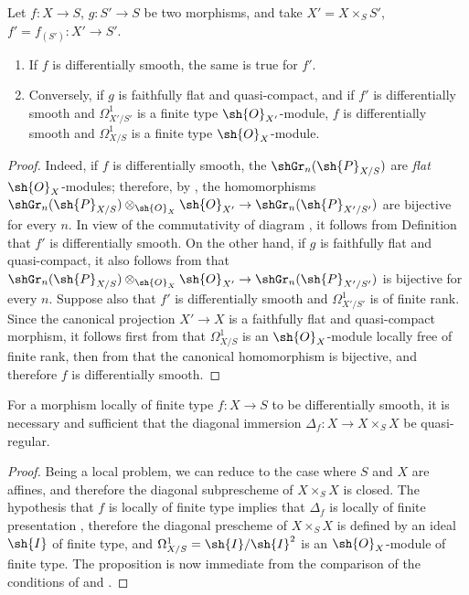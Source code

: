 \begin{proposition}[16.10.4]
\label{IV.16.10.4}
Let $f:X \to S$, $g:S' \to S$ be two morphisms, and take $X' = X \times_S S'$, $f' = f_{(S')}:X' \to S'$.
\begin{enumerate}
  \item[\rm{(i)}] If $f$ is differentially smooth, the same is true for $f'$. 
  \item[\rm{(ii)}] Conversely, if $g$ is faithfully flat and quasi-compact, and if $f'$ is differentially smooth and $\Omega_{X'/S'}^1$ is a finite type $\sh{O}_{X'}$-module, $f$ is differentially smooth and $\Omega_{X/S}^1$ is a finite type $\sh{O}_X$-module.
\end{enumerate}
\end{proposition}

\begin{proof}
Indeed, if $f$ is differentially smooth, the $\shGr_n(\sh{P}_{X/S})$ are \emph{flat} $\sh{O}_X$-modules;
therefore, by , the homomorphisms $\shGr_n(\sh{P}_{X/S}) \otimes_{\sh{O}_X} \sh{O}_{X'} \to \shGr_n(\sh{P}_{X'/S'})$ are bijective for every $n$. In view of the commutativity of diagram , it follows from Definition  that $f'$ is differentially smooth.
On the other hand, if $g$ is faithfully flat and quasi-compact, it also follows from  that $\shGr_n(\sh{P}_{X/S}) \otimes_{\sh{O}_X} \sh{O}_{X'} \to \shGr_n(\sh{P}_{X'/S'})$ is bijective for every $n$.
Suppose also that $f'$ is differentially smooth and $\Omega_{X'/S'}^1$ is of finite rank.
Since the canonical projection $X' \to X$ is a faithfully flat and quasi-compact morphism, it follows first from  that $\Omega_{X/S}^1$ is an $\sh{O}_X$-module locally free of finite rank, then from  that the canonical homomorphism  is bijective, and therefore $f$ is differentially smooth.
\end{proof}

\begin{proposition}[16.10.5]
\label{IV.16.10.5}
For a morphism locally of finite type $f:X \to S$ to be differentially smooth, it is necessary and sufficient that the diagonal immersion $\Delta_f:X \to X \times_S X$ be quasi-regular.
\end{proposition}
  

\begin{proof}
Being a local problem, we can reduce to the case where $S$ and $X$ are affines, and therefore the diagonal subprescheme of $X \times_S X$ is closed.
The hypothesis that $f$ is locally of finite type implies that $\Delta_f$ is locally of finite presentation , therefore the diagonal prescheme of $X \times_S X$ is defined by an ideal $\sh{I}$ of finite type, and $\Omega_{X/S}^1 = \sh{I}/\sh{I}^2$ is an $\sh{O}_X$-module of finite type.
The proposition is now immediate from the comparison of the conditions of  and . 
\end{proof}

